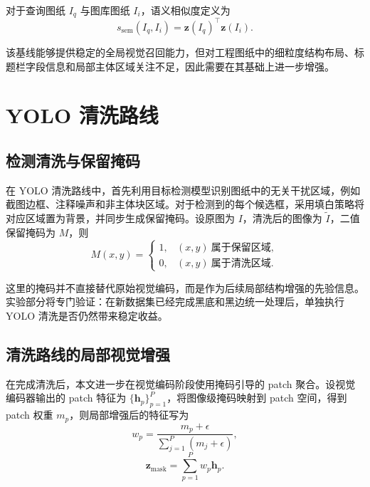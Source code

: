 对于查询图纸 $I_q$ 与图库图纸 $I_i$，语义相似度定义为
\begin{equation}
  s_{\text{sem}}(I_q,I_i)=\bm{z}(I_q)^\top \bm{z}(I_i).
  \label{eq:semantic-score-new}
\end{equation}

该基线能够提供稳定的全局视觉召回能力，但对工程图纸中的细粒度结构布局、标题栏字段信息和局部主体区域关注不足，因此需要在其基础上进一步增强。

\section{YOLO 清洗路线}

\subsection{检测清洗与保留掩码}

在 YOLO 清洗路线中，首先利用目标检测模型识别图纸中的无关干扰区域，例如截图边框、注释噪声和非主体块区域。对于检测到的每个候选框，采用填白策略将对应区域置为背景，并同步生成保留掩码。设原图为 $I$，清洗后的图像为 $\widetilde{I}$，二值保留掩码为 $M$，则
\begin{equation}
  M(x,y)=
  \begin{cases}
    1, & (x,y)\ \text{属于保留区域},\\
    0, & (x,y)\ \text{属于清洗区域}.
  \end{cases}
\end{equation}

这里的掩码并不直接替代原始视觉编码，而是作为后续局部结构增强的先验信息。实验部分将专门验证：在新数据集已经完成黑底和黑边统一处理后，单独执行 YOLO 清洗是否仍然带来稳定收益。

\subsection{清洗路线的局部视觉增强}

在完成清洗后，本文进一步在视觉编码阶段使用掩码引导的 patch 聚合。设视觉编码器输出的 patch 特征为 $\{\bm{h}_p\}_{p=1}^{P}$，将图像级掩码映射到 patch 空间，得到 patch 权重 $m_p$，则局部增强后的特征写为
\begin{equation}
  w_p=\frac{m_p+\epsilon}{\sum_{j=1}^{P}(m_j+\epsilon)},
\end{equation}
\begin{equation}
  \bm{z}_{\text{mask}}=\sum_{p=1}^{P}w_p\bm{h}_p.
  \label{eq:masked-pooling-new}
\end{equation}


